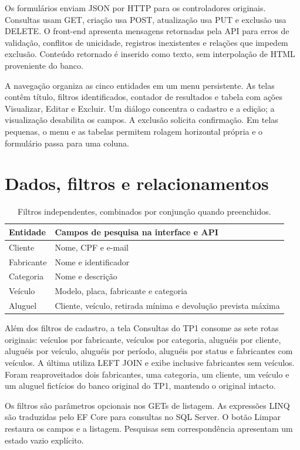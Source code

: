 \documentclass[12pt]{article}
\begin{document}
Os formulários enviam JSON por HTTP para os controladores originais. Consultas usam GET, criação usa POST, atualização usa PUT e exclusão usa DELETE. O front-end apresenta mensagens retornadas pela API para erros de validação, conflitos de unicidade, registros inexistentes e relações que impedem exclusão. Conteúdo retornado é inserido como texto, sem interpolação de HTML proveniente do banco.

A navegação organiza as cinco entidades em um menu persistente. As telas contêm título, filtros identificados, contador de resultados e tabela com ações Visualizar, Editar e Excluir. Um diálogo concentra o cadastro e a edição; a visualização desabilita os campos. A exclusão solicita confirmação. Em telas pequenas, o menu e as tabelas permitem rolagem horizontal própria e o formulário passa para uma coluna.
\section{Dados, filtros e relacionamentos}
\begin{table}[ht]
\centering\small
\begin{tabular}{p{2.3cm}p{10.4cm}}
\toprule Entidade & Campos de pesquisa na interface e API\\\midrule
Cliente & Nome, CPF e e-mail\\
Fabricante & Nome e identificador\\
Categoria & Nome e descrição\\
Veículo & Modelo, placa, fabricante e categoria\\
Aluguel & Cliente, veículo, retirada mínima e devolução prevista máxima\\\bottomrule
\end{tabular}
\caption{Filtros independentes, combinados por conjunção quando preenchidos.}
\end{table}
Além dos filtros de cadastro, a tela Consultas do TP1 consome as sete rotas originais: veículos por fabricante, veículos por categoria, aluguéis por cliente, aluguéis por veículo, aluguéis por período, aluguéis por status e fabricantes com veículos. A última utiliza LEFT JOIN e exibe inclusive fabricantes sem veículos. Foram reaproveitados dois fabricantes, uma categoria, um cliente, um veículo e um aluguel fictícios do banco original do TP1, mantendo o original intacto.

Os filtros são parâmetros opcionais nos GETs de listagem. As expressões LINQ são traduzidas pelo EF Core para consultas no SQL Server. O botão Limpar restaura os campos e a listagem. Pesquisas sem correspondência apresentam um estado vazio explícito.
\end{document}
